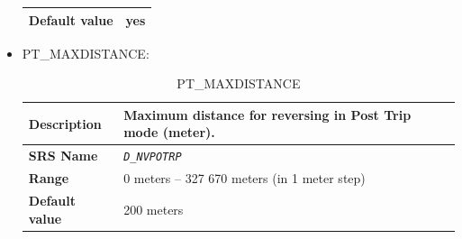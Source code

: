 \begin{itemize}
\begin{longtable}{|l|l|}
				\hline

					\begin{minipage}[t]{0.22\linewidth} \textbf{Default value}	\end{minipage}
				&	\begin{minipage}[t]{0.78\linewidth} yes \end{minipage} \\

				\hline

			\end{longtable}

		\item PT\_MAXDISTANCE:

			\begin{longtable}{|l|l|}
				\caption{PT\_MAXDISTANCE}\\
				\hline

					\begin{minipage}[t]{0.22\linewidth} \textbf{Description}	\end{minipage}
				&	\begin{minipage}[t]{0.78\linewidth} Maximum distance for reversing in Post Trip mode (meter). \end{minipage} \\

				\hline

					\begin{minipage}[t]{0.22\linewidth} \textbf{SRS Name}	\end{minipage}
				&	\begin{minipage}[t]{0.78\linewidth} \emph{\texttt{D\_NVPOTRP}} \end{minipage} \\

				\hline

					\begin{minipage}[t]{0.22\linewidth} \textbf{Range}	\end{minipage}
				&	\begin{minipage}[t]{0.78\linewidth} 0 meters – 327 670 meters (in 1 meter step) \end{minipage} \\

				\hline

					\begin{minipage}[t]{0.22\linewidth} \textbf{Default value}	\end{minipage}
				&	\begin{minipage}[t]{0.78\linewidth} 200 meters \end{minipage} \\


\end{longtable}
\end{itemize}
